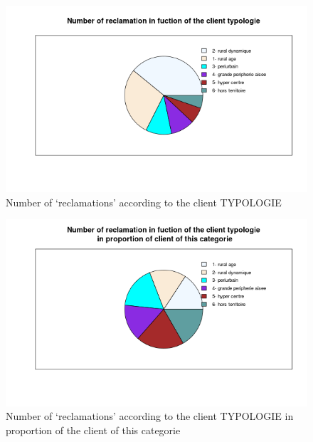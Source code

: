 \documentclass[a4paper, 11pt]{article}
\begin{document}
    \begin{figure}[!ht]
    	\centering
            \includegraphics[height = 10 cm]{Valentin/Number_of_reclamation_in_fuction_of_the_client_typologie.png}
            \caption{Number of `reclamations' according to the client TYPOLOGIE}
            \label{fig:reclamtion_typo}
    \end{figure}
    
    \begin{figure}[!ht]
    	\centering
            \includegraphics[height = 10 cm]{Valentin/Number_of_reclamation_in_fuction_of_the_client_typologie_in_proportion.png}
            \caption{Number of `reclamations' according to the client TYPOLOGIE in proportion of the client of this categorie}
            \label{fig:reclamtion_typo2}
    \end{figure}
    
\end{document}
